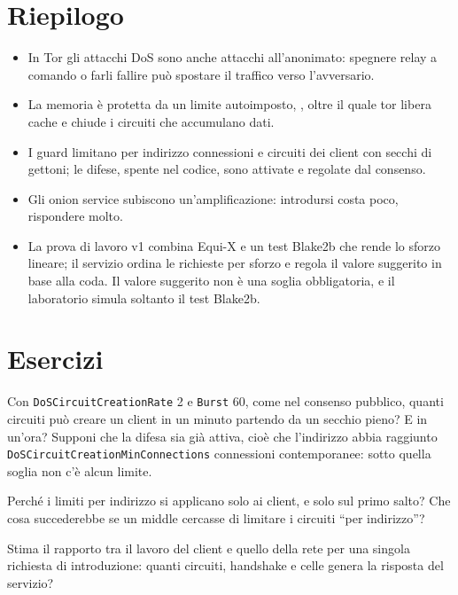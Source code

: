 \section*{Riepilogo}
\begin{itemize}
  \item In Tor gli attacchi DoS sono anche attacchi all'anonimato: spegnere relay a comando o farli fallire può spostare il traffico verso l'avversario.
  \item La memoria è protetta da un limite autoimposto, , oltre il quale tor libera cache e chiude i circuiti che accumulano dati.
  \item I guard limitano per indirizzo connessioni e circuiti dei client con secchi di gettoni; le difese, spente nel codice, sono attivate e regolate dal consenso.
  \item Gli onion service subiscono un'amplificazione: introdursi costa poco, rispondere molto.
  \item La prova di lavoro v1 combina Equi-X e un test Blake2b che rende lo sforzo lineare; il servizio ordina le richieste per sforzo e regola il valore suggerito in base alla coda. Il valore suggerito non è una soglia obbligatoria, e il laboratorio simula soltanto il test Blake2b.
\end{itemize}

\section*{Esercizi}

\begin{esercizio}[1]\label{es:15-bucket}
Con \texttt{DoSCircuitCreationRate} 2 e \texttt{Burst} 60, come nel consenso pubblico, quanti circuiti può creare un client in un minuto partendo da un secchio pieno? E in un'ora? Supponi che la difesa sia già attiva, cioè che l'indirizzo abbia raggiunto \texttt{DoSCircuitCreationMinConnections} connessioni contemporanee: sotto quella soglia non c'è alcun limite.
\end{esercizio}

\begin{esercizio}[1]\label{es:15-guard}
Perché i limiti per indirizzo si applicano solo ai client, e solo sul primo salto? Che cosa succederebbe se un middle cercasse di limitare i circuiti \enquote{per indirizzo}?
\end{esercizio}

\begin{esercizio}[2]\label{es:15-amplificazione}
Stima il rapporto tra il lavoro del client e quello della rete per una singola richiesta di introduzione: quanti circuiti, handshake e celle genera la risposta del servizio?
\end{esercizio}

